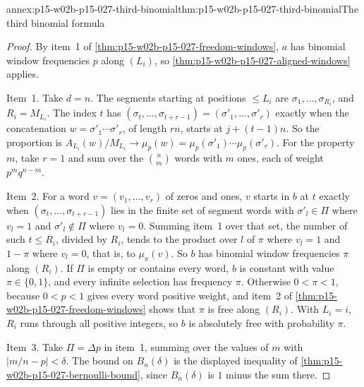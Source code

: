 \begin{annexitem}{annex:p15-w02b-p15-027-third-binomial}{thm:p15-w02b-p15-027-third-binomial}{The third binomial formula}
\begin{proof}
By item~1 of \cref{thm:p15-w02b-p15-027-freedom-windows}, \(a\) has
binomial window frequencies \(p\) along \((L_i)\), so
\cref{thm:p15-w02b-p15-027-aligned-windows} applies.

Item~1. Take \(d=n\). The segments starting at positions \(\leq L_i\) are
\(\sigma_1,\ldots,\sigma_{R_i}\), and \(R_i=M_{L_i}\). The index \(t\)
has \((\sigma_t,\ldots,\sigma_{t+r-1})=(\sigma'_1,\ldots,\sigma'_r)\)
exactly when the concatenation \(w=\sigma'_1\cdots\sigma'_r\), of length
\(rn\), starts at \(j+(t-1)n\). So the proportion is
\(A_{L_i}(w)/M_{L_i}\to\mu_p(w)=\mu_p(\sigma'_1)\cdots\mu_p(\sigma'_r)\).
For the property \(m\), take \(r=1\) and sum over the \(\binom nm\)
words with \(m\) ones, each of weight \(p^mq^{n-m}\).

Item~2. For a word \(v=(v_1,\ldots,v_r)\) of zeros and ones, \(v\) starts
in \(b\) at \(t\) exactly when \((\sigma_t,\ldots,\sigma_{t+r-1})\) lies in
the finite set of segment words with \(\sigma'_l\in\Pi\) where \(v_l=1\)
and \(\sigma'_l\notin\Pi\) where \(v_l=0\). Summing item~1 over that set,
the number of such \(t\leq R_i\), divided by \(R_i\), tends to the
product over \(l\) of \(\pi\) where \(v_l=1\) and \(1-\pi\) where
\(v_l=0\), that is, to \(\mu_\pi(v)\). So \(b\) has binomial window
frequencies \(\pi\) along \((R_i)\). If \(\Pi\) is empty or contains
every word, \(b\) is constant with value \(\pi\in\{0,1\}\), and every
infinite selection has frequency \(\pi\). Otherwise \(0<\pi<1\), because
\(0<p<1\) gives every word positive weight, and item~2 of
\cref{thm:p15-w02b-p15-027-freedom-windows} shows that \(\pi\) is free
along \((R_i)\). With \(L_i=i\), \(R_i\) runs through all positive
integers, so \(b\) is absolutely free with probability \(\pi\).

Item~3. Take \(\Pi=\Delta p\) in item~1, summing over the values of \(m\)
with \(|m/n-p|<\delta\). The bound on \(B_n(\delta)\) is the displayed
inequality of \cref{thm:p15-w02b-p15-027-bernoulli-bound}, since
\(B_n(\delta)\) is \(1\) minus the sum there.


\end{proof}
\end{annexitem}
